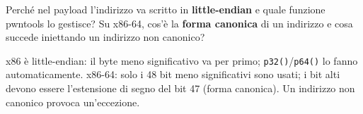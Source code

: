 \question[4]
Perché nel payload l'indirizzo va scritto in \textbf{little-endian} e quale funzione pwntools lo gestisce?
Su x86-64, cos'è la \textbf{forma canonica} di un indirizzo e cosa succede iniettando un indirizzo non canonico?
\begin{solution}
x86 è little-endian: il byte meno significativo va per primo; \lstinline|p32()|/\lstinline|p64()| lo fanno automaticamente.
x86-64: solo i 48 bit meno significativi sono usati; i bit alti devono essere l'estensione di segno del bit 47 (forma canonica). Un indirizzo non canonico provoca un'eccezione.
\end{solution}
